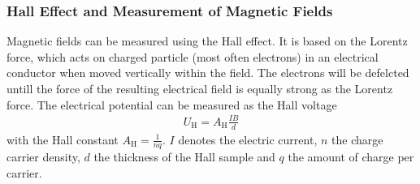 \subsubsection{Hall Effect and Measurement of Magnetic Fields}
\label{toc:HallEffect}
Magnetic fields can be measured using the Hall effect. 
It is based on the Lorentz force, which acts on charged particle (most often electrons) in an electrical conductor when moved vertically within the field. 
The electrons will be defelcted untill the force of the resulting electrical field is equally strong as the Lorentz force. 
The electrical potential can be measured as the Hall voltage
	\begin{align}
		U_{\text{H}} = A_{\text{H}}\frac{IB}{d}
	\end{align}
with the Hall constant $A_{\text{H}} = \frac{1}{nq}$. 
$I$ denotes the electric current, $n$ the charge carrier density, $d$ the thickness of the Hall sample and $q$ the amount of charge per carrier.
